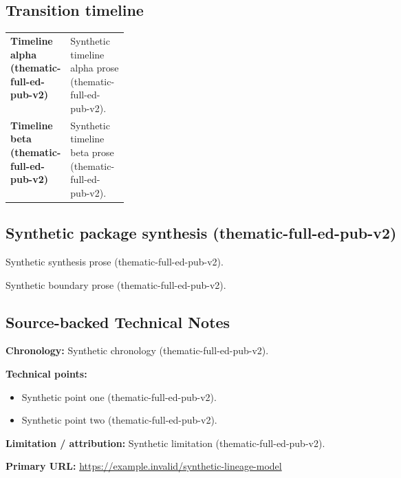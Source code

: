 \documentclass[lualatex,a4paper,10pt]{jlreq}
\begin{document}
\medskip
\begin{wideflow}
\subsection*{Transition timeline}
\begin{tabularx}{\linewidth}{@{}>{\bfseries}p{0.20\linewidth}X@{}}
Timeline alpha (thematic-full-ed-pub-v2) & Synthetic timeline alpha prose (thematic-full-ed-pub-v2). \cite{sp001lnd001} \\
Timeline beta (thematic-full-ed-pub-v2) & Synthetic timeline beta prose (thematic-full-ed-pub-v2). \cite{sp001lnd001} \\
\end{tabularx}
\end{wideflow}
\medskip
\begin{multicols}{2}
\subsection*{Synthetic package synthesis (thematic-full-ed-pub-v2)}
\noindent Synthetic synthesis prose (thematic-full-ed-pub-v2). \cite{sp001lnd001}\par\medskip
\end{multicols}
\medskip
\begin{claimboundary}
\noindent Synthetic boundary prose (thematic-full-ed-pub-v2). \cite{sp001lnd001}\par
\end{claimboundary}
\medskip
\subsection*{Source-backed Technical Notes}
\begin{technicalnote}
\noindent\textbf{Chronology:} Synthetic chronology (thematic-full-ed-pub-v2). \cite{sp001lnd001}\par
\smallskip\noindent\textbf{Technical points:}\par
\begin{itemize}
\item Synthetic point one (thematic-full-ed-pub-v2). \cite{sp001lnd001}
\item Synthetic point two (thematic-full-ed-pub-v2). \cite{sp001lnd001}
\end{itemize}
\noindent\textbf{Limitation / attribution:} Synthetic limitation (thematic-full-ed-pub-v2).\par
\smallskip\noindent\textbf{Primary URL:} \url{https://example.invalid/synthetic-lineage-model}\par
\end{technicalnote}
\smallskip
\Needspace{0.30\textheight}
\end{document}
